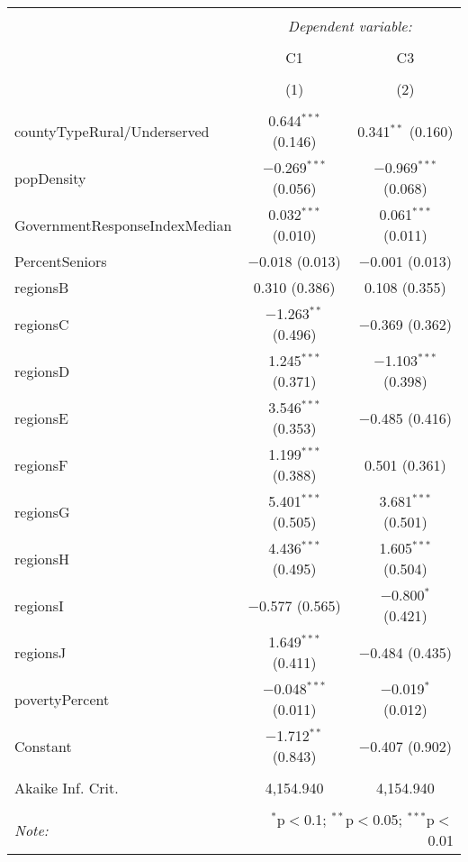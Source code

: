 
\begin{table}[!htbp] \centering 
  \caption{} 
  \label{} 
\begin{tabular}{@{\extracolsep{5pt}}lcc} 
\\[-1.8ex]\hline 
\hline \\[-1.8ex] 
 & \multicolumn{2}{c}{\textit{Dependent variable:}} \\ 
\cline{2-3} 
\\[-1.8ex] & C1 & C3 \\ 
\\[-1.8ex] & (1) & (2)\\ 
\hline \\[-1.8ex] 
 countyTypeRural/Underserved & 0.644$^{***}$ (0.146) & 0.341$^{**}$ (0.160) \\ 
  popDensity & $-$0.269$^{***}$ (0.056) & $-$0.969$^{***}$ (0.068) \\ 
  GovernmentResponseIndexMedian & 0.032$^{***}$ (0.010) & 0.061$^{***}$ (0.011) \\ 
  PercentSeniors & $-$0.018 (0.013) & $-$0.001 (0.013) \\ 
  regionsB & 0.310 (0.386) & 0.108 (0.355) \\ 
  regionsC & $-$1.263$^{**}$ (0.496) & $-$0.369 (0.362) \\ 
  regionsD & 1.245$^{***}$ (0.371) & $-$1.103$^{***}$ (0.398) \\ 
  regionsE & 3.546$^{***}$ (0.353) & $-$0.485 (0.416) \\ 
  regionsF & 1.199$^{***}$ (0.388) & 0.501 (0.361) \\ 
  regionsG & 5.401$^{***}$ (0.505) & 3.681$^{***}$ (0.501) \\ 
  regionsH & 4.436$^{***}$ (0.495) & 1.605$^{***}$ (0.504) \\ 
  regionsI & $-$0.577 (0.565) & $-$0.800$^{*}$ (0.421) \\ 
  regionsJ & 1.649$^{***}$ (0.411) & $-$0.484 (0.435) \\ 
  povertyPercent & $-$0.048$^{***}$ (0.011) & $-$0.019$^{*}$ (0.012) \\ 
  Constant & $-$1.712$^{**}$ (0.843) & $-$0.407 (0.902) \\ 
 \hline \\[-1.8ex] 
Akaike Inf. Crit. & 4,154.940 & 4,154.940 \\ 
\hline 
\hline \\[-1.8ex] 
\textit{Note:}  & \multicolumn{2}{r}{$^{*}$p$<$0.1; $^{**}$p$<$0.05; $^{***}$p$<$0.01} \\ 
\end{tabular} 
\end{table} 
